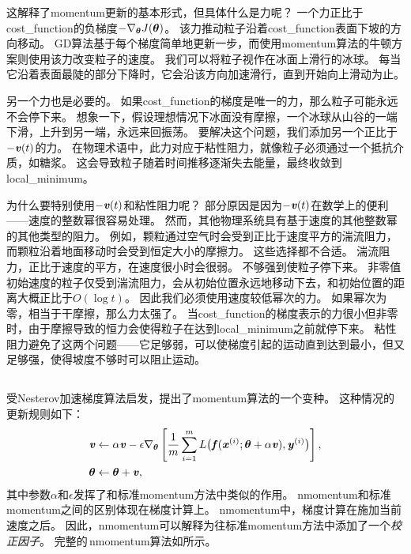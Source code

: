 这解释了\gls{momentum}更新的基本形式，但具体什么是力呢？
一个力正比于\gls{cost_function}的负梯度$-\nabla_{\boldsymbol{\theta}} J(\boldsymbol{\theta})$。
该力推动粒子沿着\gls{cost_function}表面下坡的方向移动。
\gls{GD}算法基于每个梯度简单地更新一步，而使用\gls{momentum}算法的牛顿方案则使用该力改变粒子的速度。
我们可以将粒子视作在冰面上滑行的冰球。
每当它沿着表面最陡的部分下降时，它会沿该方向加速滑行，直到开始向上滑动为止。


另一个力也是必要的。
如果\gls{cost_function}的梯度是唯一的力，那么粒子可能永远不会停下来。
想象一下，假设理想情况下冰面没有摩擦，一个冰球从山谷的一端下滑，上升到另一端，永远来回振荡。
要解决这个问题，我们添加另一个正比于$-\boldsymbol{\mathit{v}}(t)$的力。
在物理术语中，此力对应于粘性阻力，就像粒子必须通过一个抵抗介质，如糖浆。
这会导致粒子随着时间推移逐渐失去能量，最终收敛到\gls{local_minimum}。


为什么要特别使用$-\boldsymbol{\mathit{v}}(t)$和粘性阻力呢？
部分原因是因为$-\boldsymbol{\mathit{v}}(t)$在数学上的便利——速度的整数幂很容易处理。
然而，其他物理系统具有基于速度的其他整数幂的其他类型的阻力。
例如，颗粒通过空气时会受到正比于速度平方的湍流阻力，而颗粒沿着地面移动时会受到恒定大小的摩擦力。
这些选择都不合适。
湍流阻力，正比于速度的平方，在速度很小时会很弱。
不够强到使粒子停下来。
非零值初始速度的粒子仅受到湍流阻力，会从初始位置永远地移动下去，和初始位置的距离大概正比于$O(\log t)$。
因此我们必须使用速度较低幂次的力。
如果幂次为零，相当于干摩擦，那么力太强了。
当\gls{cost_function}的梯度表示的力很小但非零时，由于摩擦导致的恒力会使得粒子在达到\gls{local_minimum}之前就停下来。
粘性阻力避免了这两个问题——它足够弱，可以使梯度引起的运动直到达到最小，但又足够强，使得坡度不够时可以阻止运动。


\subsection{}
\label{sec:nesterov_momentum}
受Nesterov加速梯度算法\citep{Nesterov83b,Nesterov03}启发，\cite{sutskeverimportance}提出了\gls{momentum}算法的一个变种。
这种情况的更新规则如下：
\begin{align}
    \boldsymbol{\mathit{v}} &\leftarrow \alpha\boldsymbol{\mathit{v}} - \epsilon \nabla_{\boldsymbol{\theta}} \left[
    \frac{1}{m} \sum_{i=1}^m L\big( \boldsymbol{\mathit{f}}(\boldsymbol{\mathit{x}}^{(i)}; \boldsymbol{\theta} + \alpha \boldsymbol{\mathit{v}}), \boldsymbol{\mathit{y}}^{(i)} \big)
 \right], \\
    \boldsymbol{\theta} &\leftarrow \boldsymbol{\theta} + \boldsymbol{\mathit{v}} ,
\end{align}
其中参数$\alpha$和$\epsilon$发挥了和标准\gls{momentum}方法中类似的作用。 
\gls{nmomentum}和标准\gls{momentum}之间的区别体现在梯度计算上。
\gls{nmomentum}中，梯度计算在施加当前速度之后。
因此，\gls{nmomentum}可以解释为往标准\gls{momentum}方法中添加了一个\emph{校正因子}。
完整的\,\gls{nmomentum}算法如所示。



